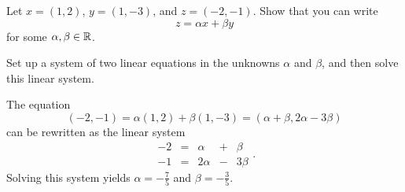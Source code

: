 \documentclass{ximera}
\begin{document}
\begin{exercise} \label{c4.3.3}
Let $x=(1,2)$, $y=(1,-3)$, and $z=(-2,-1)$.  Show that you can
write
\[
z=\alpha x+ \beta y
\]
for some $\alpha,\beta\in\mbox{$\Bbb{R}$}$.

 Set up a system of two linear equations in
the unknowns $\alpha$ and $\beta$, and then solve this linear
system.

\begin{solution}

The equation
\[ (-2, -1) = \alpha(1,2) + \beta(1,-3) =
(\alpha + \beta, 2\alpha - 3\beta ) \]
can be rewritten as the linear system
\[ \begin{array}{rrrrr}
-2 & = & \alpha & + & \beta \\
-1 & = & 2\alpha & - & 3\beta\end{array}. \]
Solving this system yields $\alpha = -\frac{7}{5}$ and
$\beta = -\frac{3}{5}$.

\end{solution}
\end{exercise}
\end{document}
